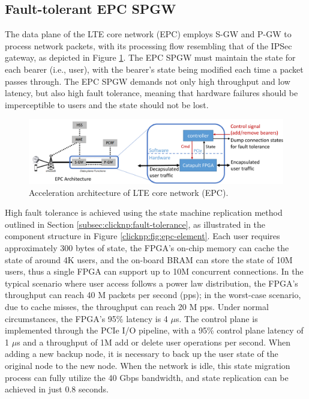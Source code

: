 \subsection{Fault-tolerant EPC SPGW}

The data plane of the LTE core network (EPC) employs S-GW and P-GW to process network packets, with its processing flow resembling that of the IPSec gateway, as depicted in Figure \ref{clicknp:fig:epc-arch}. The EPC SPGW must maintain the state for each bearer (i.e., user), with the bearer's state being modified each time a packet passes through. The EPC SPGW demands not only high throughput and low latency, but also high fault tolerance, meaning that hardware failures should be imperceptible to users and the state should not be lost.

\begin{figure}[htbp]
	\centering
	\includegraphics[width=1.0\textwidth]{image/EPC_arch}
	\caption{Acceleration architecture of LTE core network (EPC).}
	\label{clicknp:fig:epc-arch}
\end{figure}

High fault tolerance is achieved using the state machine replication method outlined in Section \ref{subsec:clicknp:fault-tolerance}, as illustrated in the component structure in Figure \ref{clicknp:fig:epc-element}. Each user requires approximately 300 bytes of state, the FPGA's on-chip memory can cache the state of around 4K users, and the on-board BRAM can store the state of 10M users, thus a single FPGA can support up to 10M concurrent connections. In the typical scenario where user access follows a power law distribution, the FPGA's throughput can reach 40 M packets per second (pps); in the worst-case scenario, due to cache misses, the throughput can reach 20 M pps. Under normal circumstances, the FPGA's 95\% latency is 4 $\mu$s. The control plane is implemented through the PCIe I/O pipeline, with a 95\% control plane latency of 1 $\mu$s and a throughput of 1M add or delete user operations per second. When adding a new backup node, it is necessary to back up the user state of the original node to the new node. When the network is idle, this state migration process can fully utilize the 40 Gbps bandwidth, and state replication can be achieved in just 0.8 seconds.

